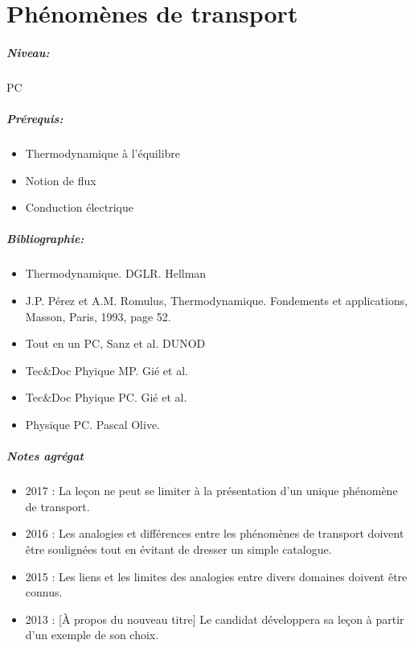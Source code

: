 \documentclass[11pt]{report}
\numberwithin{figure}{section}
\numberwithin{equation}{section}
\numberwithin{table}{section}
\newcommand{\1}{\boldsymbol{1}}
\begin{document}
\newpage


\chapter{Phénomènes de transport}


\paragraph*{Niveau:} PC
\paragraph*{Prérequis:} 
\begin{itemize}
\item Thermodynamique à l'équilibre
\item Notion de flux
\item Conduction électrique
\end{itemize}

\paragraph*{Bibliographie:}
\begin{itemize}
\item Thermodynamique. DGLR. Hellman
\item J.P. Pérez et A.M. Romulus, Thermodynamique. Fondements et applications, Masson, Paris, 1993, page 52.
\item Tout en un PC, Sanz et al. DUNOD
\item Tec\&Doc Phyique MP. Gié et al.
\item Tec\&Doc Phyique PC.  Gié et al.
\item Physique PC. Pascal Olive.
\end{itemize}

\paragraph{Notes agrégat}
\begin{itemize}
\item 2017 : La leçon ne peut se limiter à la présentation d’un unique phénomène de transport.
\item 2016 : Les analogies et différences entre les phénomènes de transport doivent être soulignées
tout en évitant de dresser un simple catalogue.
\item 2015 : Les liens et les limites des analogies entre divers domaines doivent être connus.
\item 2013 : [À propos du nouveau titre] Le candidat développera sa leçon à partir d’un exemple
de son choix.
\end{itemize}
\end{document}
